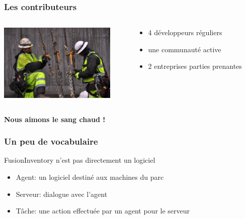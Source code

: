 \documentclass{beamer}
\begin{document}
\begin{frame}
    \frametitle{Les contributeurs}

 \begin{columns}
 \begin{column}[T]{4cm}
    \includegraphics[height=3.7cm]{./pics/worker.jpg}
 \end{column}
 \begin{column}[t]{5cm}
    \begin{itemize}
    \item 4 développeurs réguliers
    \item une communauté active
    \item 2 entreprises parties prenantes
    \end{itemize}

 \end{column}
\end{columns}

    \pause
    \bf{Nous aimons le sang chaud !}
\end{frame}



\begin{frame}
    \frametitle{Un peu de vocabulaire}

    \begin{block}{FusionInventory n'est pas directement un logiciel}
    \begin{itemize}
        \item Agent: un logiciel destiné aux machines du parc
        \item Serveur: dialogue avec l'agent
        \item Tâche: une action effectuée par un agent pour le serveur
    \end{itemize}
    \end{block}

\end{frame}
\end{document}
